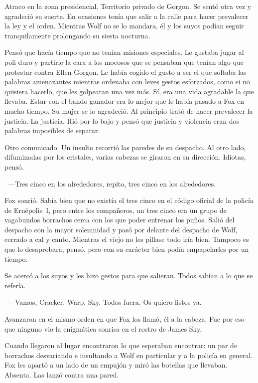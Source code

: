 Atraco en la zona presidencial. Territorio privado de Gorgon. Se sentó otra vez y agradeció su suerte. En ocasiones tenía que salir a la calle para hacer prevalecer la ley y el orden. Mientras Wolf no se lo mandara, él y los suyos podían seguir tranquilamente prolongando su siesta nocturna.

Pensó que hacía tiempo que no tenían misiones especiales. Le gustaba jugar al poli duro y partirle la cara a los mocosos que se pensaban que tenían algo que protestar contra Ellen Gorgon. Le había cogido el gusto a ser el que soltaba las palabras amenazantes mientras ordenaba con leves gestos esforzados, como si no quisiera hacerlo, que les golpearan una vez más. Sí, era una vida agradable la que llevaba. Estar con el bando ganador era lo mejor que le había pasado a Fox en mucho tiempo. Su mujer se lo agradeció. Al principio trató de hacer prevalecer la justicia. La justicia. Rió por lo bajo y pensó que justicia y violencia eran dos palabras imposibles de separar.

Otro comunicado. Un insulto recorrió las paredes de su despacho. Al otro lado, difuminadas por los cristales, varias cabezas se giraron en su dirección. Idiotas, pensó.

~---Tres cinco en los alrededores, repito, tres cinco en los alrededores.

Fox sonrió. Sabía bien que no existía el tres cinco en el código oficial de la policía de Ernépolis~I, pero entre los compañeros, un tres cinco era un grupo de vagabundos borrachos cerca con los que poder entrenar los puños. Salió del despacho con la mayor solemnidad y pasó por delante del despacho de Wolf, cerrado a cal y canto. Mientras el viejo no les pillase todo iría bien. Tampoco es que lo desaprobara, pensó, pero con su carácter bien podía empapelarles por un tiempo.

Se acercó a los suyos y les hizo gestos para que salieran. Todos sabían a lo que se refería.

~---Vamos, Cracker, Warp, Sky. Todos fuera. Os quiero listos ya.

Avanzaron en el mismo orden en que Fox los llamó, él a la cabeza. Fue por eso que ninguno vio la enigmática sonrisa en el rostro de James Sky.


Cuando llegaron al lugar encontraron lo que esperaban encontrar: un par de borrachos desvariando e insultando a Wolf en particular y a la policía en general. Fox les apartó a un lado de un empujón y miró las botellas que llevaban. Absenta. Las lanzó contra una pared.

